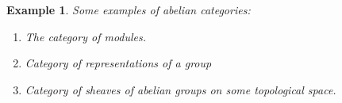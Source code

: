 \documentclass[12pt]{article}
\numberwithin{equation}{section}
\newcounter{dummy} \numberwithin{dummy}{section}
\newtheorem{definition}[dummy]{Definition}
\newtheorem{example}[dummy]{Example}
\begin{document}
	\begin{example}Some examples of abelian categories:
		\begin{enumerate}
			\item The category of modules.
			\item Category of representations of a group
			\item Category of sheaves of abelian groups on some topological space.
			

\end{enumerate}
\end{example}
\end{document}
